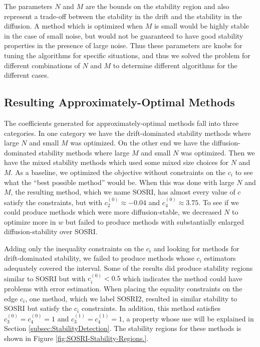 \documentclass{article}
\begin{document}
The parameters $N$ and $M$ are the bounds on the stability region
and also represent a trade-off between the stability in the drift
and the stability in the diffusion. A method which is optimized when
$M$ is small would be highly stable in the case of small noise, but
would not be guaranteed to have good stability properties in the presence
of large noise. Thus these parameters are knobs for tuning the algorithms
for specific situations, and thus we solved the problem for different
combinations of $N$ and $M$ to determine different algorithms for
the different cases.

\subsection{Resulting Approximately-Optimal Methods}

The coefficients generated for approximately-optimal methods fall
into three categories. In one category we have the drift-dominated
stability methods where large $N$ and small $M$ was optimized. On
the other end we have the diffusion-dominated stability methods where
large $M$ and small $N$ was optimized. Then we have the mixed stability
methods which used some mixed size choices for $N$ and $M$. As a
baseline, we optimized the objective without constraints on the $c_{i}$
to see what the ``best possible method'' would be. When this was
done with large $N$ and $M$, the resulting method, which we name
SOSRI, has almost every value of $c$ satisfy the constraints, but
with $c_{2}^{(0)}\approx-0.04$ and $c_{4}^{(0)}\approx3.75$. To
see if we could produce methods which were more diffusion-stable,
we decreased $N$ to optimize more in $w$ but failed to produce methods
with substantially enlarged diffusion-stability over SOSRI.

Adding only the inequality constraints on the $c_{i}$ and looking
for methods for drift-dominated stability, we failed to produce methods
whose $c_{i}$ estimators adequately covered the interval. Some of
the results did produce stability regions similar to SOSRI but with
$c_{i}^{(0)}<0.5$ which indicates the method could have problems
with error estimation. When placing the equality constraints on the
edge $c_{i}$, one method, which we label SOSRI2, resulted in similar
stability to SOSRI but satisfy the $c_{i}$ constraints. In addition,
this method satisfies $c_{3}^{(0)}=c_{4}^{(0)}=1$ and $c_{3}^{(1)}=c_{4}^{(1)}=1$,
a property whose use will be explained in Section \ref{subsec:StabilityDetection}.
The stability regions for these methods is shown in Figure \ref{fig:SOSRI-Stability-Regions.}.
\end{document}
